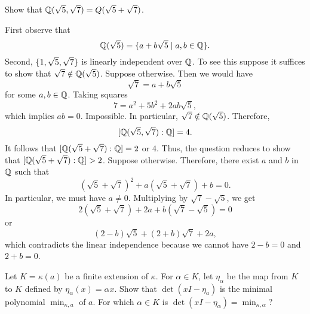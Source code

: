 \begin{probl}\label{probl:sqrt5,sqrt7=sqrt5+sqrt7}
    Show that\/ $\mathbb{Q}(\sqrt5,\sqrt7) = Q(\sqrt5+\sqrt7)$.
\end{probl}

\begin{solution}
    First observe that
    $$
        \mathbb{Q}(\sqrt5)=\{a+b\sqrt5\mid a,b\in\mathbb{Q}\}.
    $$
    Second, $\{1,\sqrt5,\sqrt7\}$ is linearly independent over $\mathbb{Q}$. To see this suppose it suffices to show that $\sqrt7\notin\mathbb{Q}(\sqrt5)$. Suppose otherwise. Then we would have
    $$
        \sqrt7=a+b\sqrt5
    $$
    for some $a,b\in\mathbb{Q}$. Taking squares
    $$
        7= a^2+5b^2+2ab\sqrt5,
    $$
    which implies $ab=0$. Impossible. In particular, $\sqrt7\notin\mathbb{Q}(\sqrt5)$. Therefore,
    $$
        [\mathbb{Q}(\sqrt5,\sqrt7):\mathbb{Q}]=4.
    $$
    It follows that $[\mathbb{Q}(\sqrt5+\sqrt7):\mathbb{Q}]=2$ or $4$. Thus, the question reduces to show that $[\mathbb{Q}(\sqrt5+\sqrt7):\mathbb{Q}]>2$. Suppose otherwise. Therefore, there exist $a$ and $b$ in $\mathbb{Q}$ such that
    $$
        (\sqrt5+\sqrt7)^2+a(\sqrt5+\sqrt7)+b=0.
    $$
    In particular, we must have $a\ne0$. Multiplying by $\sqrt7-\sqrt5$, we get
    $$
        2(\sqrt5+\sqrt7)+2a+b(\sqrt7-\sqrt5)=0
    $$
    or
    $$
        (2-b)\sqrt5 + (2+b)\sqrt7 + 2a,
    $$
    which contradicts the linear independence because we cannot have $2-b=0$ and $2+b=0$.
\end{solution}

\begin{probl}
    Let\/ $K=\kappa(a)$ be a finite extension of\/ $\kappa$. For\/ $\alpha\in K$, let\/ $\eta_\alpha$ be the map from\/ $K$ to\/ $K$ defined by\/ $\eta_\alpha(x) = \alpha x$. Show that\/ $\det(xI-\eta_a)$ is the minimal polynomial\/ $\min_{\kappa, a}$ of\/ $a$. For which\/ $\alpha\in K$ is\/ $\det(xI-\eta_\alpha) = \min_{\kappa,\alpha}$?
\end{probl}

